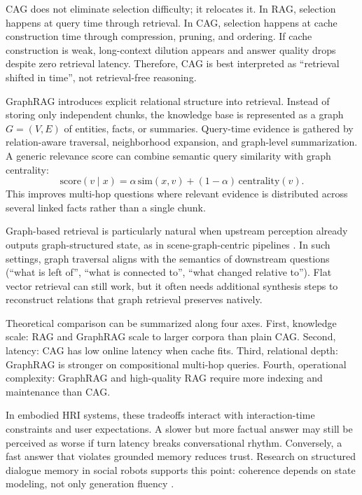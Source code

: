  CAG does not eliminate selection difficulty; it relocates it. In RAG, selection happens at query time through retrieval. In CAG, selection happens at cache construction time through compression,
  pruning, and ordering. If cache construction is weak, long-context dilution appears and answer quality drops despite zero retrieval latency. Therefore, CAG is best interpreted as \enquote{retrieval
  shifted in time}, not retrieval-free reasoning.

  GraphRAG introduces explicit relational structure into retrieval. Instead of storing only independent chunks, the knowledge base is represented as a graph \(G=(V,E)\) of entities, facts, or summaries.
  Query-time evidence is gathered by relation-aware traversal, neighborhood expansion, and graph-level summarization. A generic relevance score can combine semantic query similarity with graph
  centrality:
  \[
  \mathrm{score}(v\mid x)=\alpha\,\mathrm{sim}(x,v)+(1-\alpha)\,\mathrm{centrality}(v).
  \]
  This improves multi-hop questions where relevant evidence is distributed across several linked facts rather than a single chunk.

  Graph-based retrieval is particularly natural when upstream perception already outputs graph-structured state, as in scene-graph-centric pipelines \cite{wang_indvissgg_2025,li_vlm-msgraph_2025}. In
  such settings, graph traversal aligns with the semantics of downstream questions (\enquote{what is left of}, \enquote{what is connected to}, \enquote{what changed relative to}). Flat vector retrieval
  can still work, but it often needs additional synthesis steps to reconstruct relations that graph retrieval preserves natively.

  Theoretical comparison can be summarized along four axes. First, knowledge scale: RAG and GraphRAG scale to larger corpora than plain CAG. Second, latency: CAG has low online latency when cache fits.
  Third, relational depth: GraphRAG is stronger on compositional multi-hop queries. Fourth, operational complexity: GraphRAG and high-quality RAG require more indexing and maintenance than CAG.

  In embodied HRI systems, these tradeoffs interact with interaction-time constraints and user expectations. A slower but more factual answer may still be perceived as worse if turn latency breaks
  conversational rhythm. Conversely, a fast answer that violates grounded memory reduces trust. Research on structured dialogue memory in social robots supports this point: coherence depends on state
  modeling, not only generation fluency \cite{grassi2022knowledge,grassi2023knowledge,gava2024physical}.

